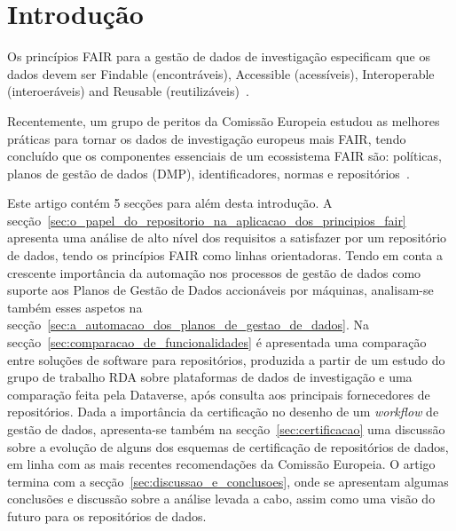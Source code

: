 \documentclass[sigconf,nonacm]{acmart}
\begin{document}

\maketitle

\section{Introdução}

Os princípios FAIR para a gestão de dados de investigação especificam que os dados devem ser Findable (encontráveis), Accessible (acessíveis), Interoperable (interoeráveis) and Reusable (reutilizáveis)~\cite{wilkinson2016fair}. 

Recentemente, um grupo de peritos da Comissão Europeia estudou as melhores práticas para tornar os dados de investigação europeus mais FAIR, tendo concluído que os componentes essenciais de um ecossistema FAIR são: políticas, planos de gestão de dados (DMP), identificadores, normas e repositórios~\cite{hodson2018turning}. 


Este artigo contém 5 secções para além desta introdução. A secção~\ref{sec:o_papel_do_repositorio_na_aplicacao_dos_principios_fair} apresenta uma análise de alto nível dos requisitos a satisfazer por um repositório de dados, tendo os princípios FAIR como linhas orientadoras. 
%
Tendo em conta a crescente importância da automação nos processos de gestão de dados como suporte aos Planos de Gestão de Dados accionáveis por máquinas, analisam-se também esses aspetos na secção~\ref{sec:a_automacao_dos_planos_de_gestao_de_dados}.
%
Na secção~\ref{sec:comparacao_de_funcionalidades} é apresentada uma comparação entre soluções de software para repositórios, produzida a partir de um estudo do grupo de trabalho RDA sobre plataformas de dados de investigação e uma comparação feita pela Dataverse, após consulta aos principais fornecedores de repositórios.
%
Dada a importância da certificação no desenho de um \emph{workflow} de gestão de dados, apresenta-se também na secção~\ref{sec:certificacao} uma discussão sobre a evolução de alguns dos esquemas de certificação de repositórios de dados, em linha com as mais recentes recomendações da Comissão Europeia. 
%
O artigo termina com a secção~\ref{sec:discussao_e_conclusoes}, onde se apresentam algumas conclusões e discussão sobre a análise levada a cabo, assim como uma visão do futuro para os repositórios de dados. 
\end{document}
